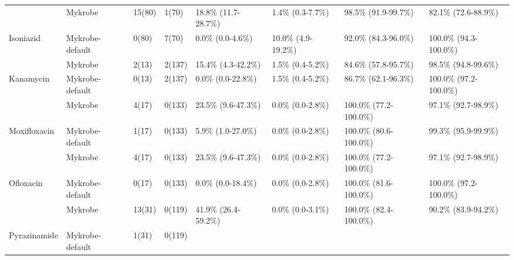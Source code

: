 \begin{table}[]
{\begin{tabular}{|l|l|l|l|l|l|l|l|}
 &
  Mykrobe &
  15(80) &
  1(70) &
  18.8\% (11.7-28.7\%) &
  1.4\% (0.3-7.7\%) &
  98.5\% (91.9-99.7\%) &
  82.1\% (72.6-88.9\%) \\ \cline{2-8} 
\multirow{-2}{*}{Isoniazid} &
  \cellcolor[HTML]{EFEFEF}Mykrobe-default &
  \cellcolor[HTML]{EFEFEF}0(80) &
  \cellcolor[HTML]{EFEFEF}7(70) &
  \cellcolor[HTML]{EFEFEF}0.0\% (0.0-4.6\%) &
  \cellcolor[HTML]{EFEFEF}10.0\% (4.9-19.2\%) &
  \cellcolor[HTML]{EFEFEF}92.0\% (84.3-96.0\%) &
  \cellcolor[HTML]{EFEFEF}100.0\% (94.3-100.0\%) \\ \hline
 &
  Mykrobe &
  2(13) &
  2(137) &
  15.4\% (4.3-42.2\%) &
  1.5\% (0.4-5.2\%) &
  84.6\% (57.8-95.7\%) &
  98.5\% (94.8-99.6\%) \\ \cline{2-8} 
\multirow{-2}{*}{Kanamycin} &
  \cellcolor[HTML]{EFEFEF}Mykrobe-default &
  \cellcolor[HTML]{EFEFEF}0(13) &
  \cellcolor[HTML]{EFEFEF}2(137) &
  \cellcolor[HTML]{EFEFEF}0.0\% (0.0-22.8\%) &
  \cellcolor[HTML]{EFEFEF}1.5\% (0.4-5.2\%) &
  \cellcolor[HTML]{EFEFEF}86.7\% (62.1-96.3\%) &
  \cellcolor[HTML]{EFEFEF}100.0\% (97.2-100.0\%) \\ \hline
 &
  Mykrobe &
  4(17) &
  0(133) &
  23.5\% (9.6-47.3\%) &
  0.0\% (0.0-2.8\%) &
  100.0\% (77.2-100.0\%) &
  97.1\% (92.7-98.9\%) \\ \cline{2-8} 
\multirow{-2}{*}{Moxifloxacin} &
  \cellcolor[HTML]{EFEFEF}Mykrobe-default &
  \cellcolor[HTML]{EFEFEF}1(17) &
  \cellcolor[HTML]{EFEFEF}0(133) &
  \cellcolor[HTML]{EFEFEF}5.9\% (1.0-27.0\%) &
  \cellcolor[HTML]{EFEFEF}0.0\% (0.0-2.8\%) &
  \cellcolor[HTML]{EFEFEF}100.0\% (80.6-100.0\%) &
  \cellcolor[HTML]{EFEFEF}99.3\% (95.9-99.9\%) \\ \hline
 &
  Mykrobe &
  4(17) &
  0(133) &
  23.5\% (9.6-47.3\%) &
  0.0\% (0.0-2.8\%) &
  100.0\% (77.2-100.0\%) &
  97.1\% (92.7-98.9\%) \\ \cline{2-8} 
\multirow{-2}{*}{Ofloxacin} &
  \cellcolor[HTML]{EFEFEF}Mykrobe-default &
  \cellcolor[HTML]{EFEFEF}0(17) &
  \cellcolor[HTML]{EFEFEF}0(133) &
  \cellcolor[HTML]{EFEFEF}0.0\% (0.0-18.4\%) &
  \cellcolor[HTML]{EFEFEF}0.0\% (0.0-2.8\%) &
  \cellcolor[HTML]{EFEFEF}100.0\% (81.6-100.0\%) &
  \cellcolor[HTML]{EFEFEF}100.0\% (97.2-100.0\%) \\ \hline
 &
  Mykrobe &
  13(31) &
  0(119) &
  41.9\% (26.4-59.2\%) &
  0.0\% (0.0-3.1\%) &
  100.0\% (82.4-100.0\%) &
  90.2\% (83.9-94.2\%) \\ \cline{2-8} 
\multirow{-2}{*}{Pyrazinamide} &
  \cellcolor[HTML]{EFEFEF}Mykrobe-default &
  \cellcolor[HTML]{EFEFEF}1(31) &
  \cellcolor[HTML]{EFEFEF}0(119) &

\end{tabular}}
\end{table}
